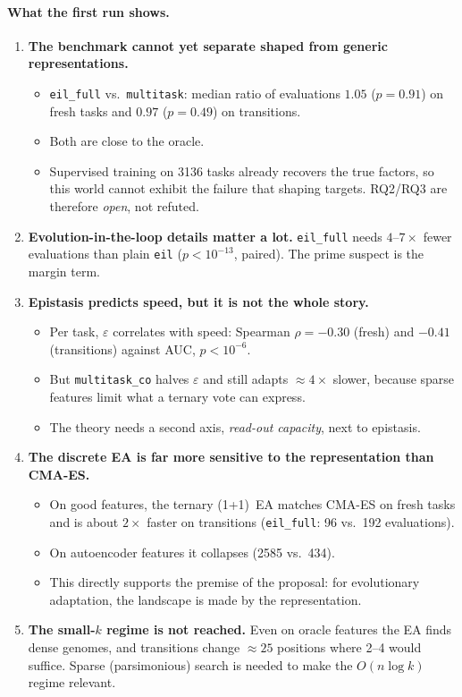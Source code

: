 \documentclass[11pt,a4paper]{article}
\theoremstyle{definition}
\theoremstyle{plain}
\theoremstyle{remark}
\begin{document}
\paragraph{What the first run shows.}
\begin{enumerate}
\item \textbf{The benchmark cannot yet separate shaped from generic representations.}
\begin{itemize}
\item \texttt{eil\_full} vs.\ \texttt{multitask}: median ratio of evaluations $1.05$ ($p=0.91$) on fresh tasks and $0.97$ ($p=0.49$) on transitions.
\item Both are close to the oracle.
\item Supervised training on 3136 tasks already recovers the true factors, so this world cannot exhibit the failure that shaping targets. RQ2/RQ3 are therefore \emph{open}, not refuted.
\end{itemize}
\item \textbf{Evolution-in-the-loop details matter a lot.} \texttt{eil\_full} needs $4$--$7\times$ fewer evaluations than plain \texttt{eil} ($p<10^{-13}$, paired). The prime suspect is the margin term.
\item \textbf{Epistasis predicts speed, but it is not the whole story.}
\begin{itemize}
\item Per task, $\varepsilon$ correlates with speed: Spearman $\rho=-0.30$ (fresh) and $-0.41$ (transitions) against AUC, $p<10^{-6}$.
\item But \texttt{multitask\_co} halves $\varepsilon$ and still adapts $\approx4\times$ slower, because sparse features limit what a ternary vote can express.
\item The theory needs a second axis, \emph{read-out capacity}, next to epistasis.
\end{itemize}
\item \textbf{The discrete EA is far more sensitive to the representation than CMA-ES.}
\begin{itemize}
\item On good features, the ternary (1+1)~EA matches CMA-ES on fresh tasks and is about $2\times$ faster on transitions (\texttt{eil\_full}: 96 vs.\ 192 evaluations).
\item On autoencoder features it collapses (2585 vs.\ 434).
\item This directly supports the premise of the proposal: for evolutionary adaptation, the landscape is made by the representation.
\end{itemize}
\item \textbf{The small-$k$ regime is not reached.} Even on oracle features the EA finds dense genomes, and transitions change $\approx25$ positions where 2--4 would suffice. Sparse (parsimonious) search is needed to make the $O(n\log k)$ regime relevant.
\end{enumerate}
\end{document}

